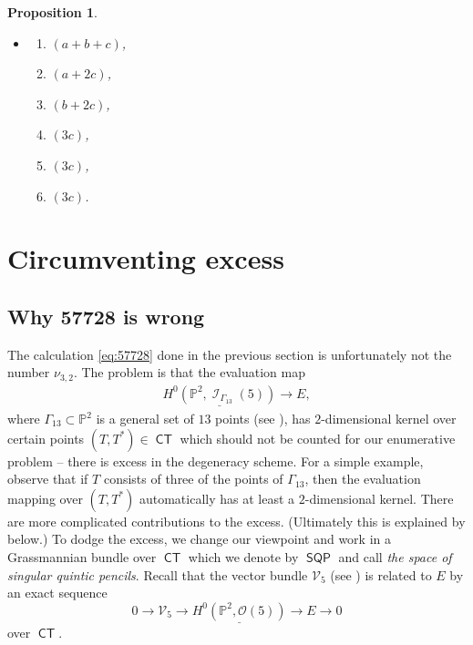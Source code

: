 \documentclass[reqno, 11pt]{amsart}
\theoremstyle{plain}
\newtheorem{proposition}[theorem]{Proposition}
\theoremstyle{remark}
\renewcommand{\P}{\mathbb{P}}
\DeclareMathOperator{\I}{\mathcal{I}}
\renewcommand{\O}{\mathcal{O}}
\DeclareMathOperator{\CT}{\mathsf{CT}}
\DeclareMathOperator{\SQP}{\mathsf{SQP}}
\begin{document}
\begin{proposition}
\begin{itemize}
\begin{enumerate}
        \item $(3a,3b,3c)$,
        \item $(3a,b+2c,3c)$,
        \item $(3b,b+2c,3c)$,
        \item $(b+2c,2b+c,3c)$,
        \item $(a+2c,b+2c,3c)$,
        \item $(a+2c,b+2c,3c)$.
    \end{enumerate}
    \item[$\O(H)$:] \begin{enumerate}
        \item $(a+b+c)$,
        \item $(a+2c)$,
        \item $(b+2c)$,
        \item $(3c)$,
        \item $(3c)$,
        \item $(3c)$. 
    \end{enumerate}
\end{itemize}
\end{proposition} 

\section{Circumventing excess}
\label{sec:pencilspace}

\subsection{Why 57728 is wrong}

The calculation \eqref{eq:57728} done in the previous section is unfortunately not the number $\nu_{3,2}$.  The problem is that the  evaluation map 
\begin{align}
    \label{eq:ev}
\underline{H^{0}(\P^{2}, \I_{\Gamma_{13}}(5))} \to E,
\end{align}
where $\Gamma_{13} \subset \P^{2}$ is a general set of $13$ points (see ), has $2$-dimensional kernel over certain points $(T,T^{*}) \in \CT$ which should not be counted for our enumerative problem -- there is excess in the degeneracy scheme.  For a simple example, observe that if $T$ consists of three of the points of $\Gamma_{13}$, then the evaluation mapping over $(T,T^{*})$ automatically has at least a $2$-dimensional kernel. There are more complicated contributions to the excess. (Ultimately this is explained by  below.) To dodge the excess, we change our viewpoint and work in a Grassmannian bundle over $\CT$ which we denote by $\SQP$ and call \emph{the space of singular quintic pencils}.  Recall that the vector bundle $\mathcal{V}_{5}$ (see ) is related to $E$ by an exact sequence $$0 \to \mathcal{V}_{5} \to \underline{H^{0}(\P^{2}, \O(5))} \to E \to 0$$ over $\CT$.
\end{document}
